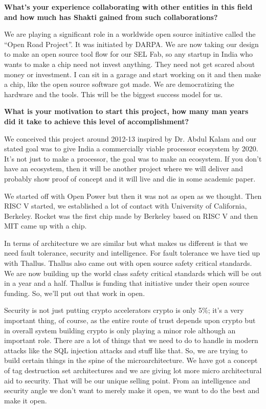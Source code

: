 \begin{multicols}{2}
{\bf What's your experience collaborating with other entities in this field and how much has Shakti gained from such collaborations? }

We are playing a significant role in a worldwide open source initiative called the ``Open Road Project''.  It was initiated by DARPA. We are now taking our design to make an open source tool flow for our SEL Fab, so any startup in India who wants to make a chip need not invest anything. They need not get scared about money or investment. I can sit in a garage and start working on it and then make a chip, like the open source software got made. We are democratizing the hardware and the tools. This will be the biggest success model for us.
\smallskip

{\bf What is your motivation to start this project, how many man years did it take to achieve this level of accomplishment?}

We conceived this project around 2012-13 inspired by Dr. Abdul Kalam and our stated goal was to give India a commercially viable processor ecosystem by 2020. It's not just to make a processor, the goal was to make an ecosystem. If you don't have an ecosystem, then it will be another project where we will deliver and probably show proof of concept and it will live and die in some academic paper. 

We started off with Open Power but then it was not as open as we thought. Then RISC V started, we established a lot of contact with University of California, Berkeley. Rocket was the first chip made by Berkeley based on RISC V and then MIT came up with a chip.

In terms of architecture we are similar but what makes us different is that we need fault tolerance, security and intelligence. For fault tolerance we have tied up with Thallus. Thallus also came out with open source safety critical standards.  We are now building up the world class safety critical standards which will be out in a year and a half.  Thallus is funding that initiative under their open source funding.  So, we'll put out that work in open.

Security is not just putting crypto accelerators crypto is only 5\%; it's a very important thing, of course, as the entire route of trust depends upon crypto but in overall system building crypto is only playing a minor role although an important role. There are a lot of things that we need to do to handle in modern attacks like the SQL injection attacks and stuff like that. So, we are trying to build certain things in the spine of the microarchitecture. We have got a concept of tag destruction set architectures and we are giving lot more micro architectural aid to security. That will be our unique selling point. From an intelligence and security angle we don't want to merely make it open, we want to do the best and make it open.


\end{multicols}

